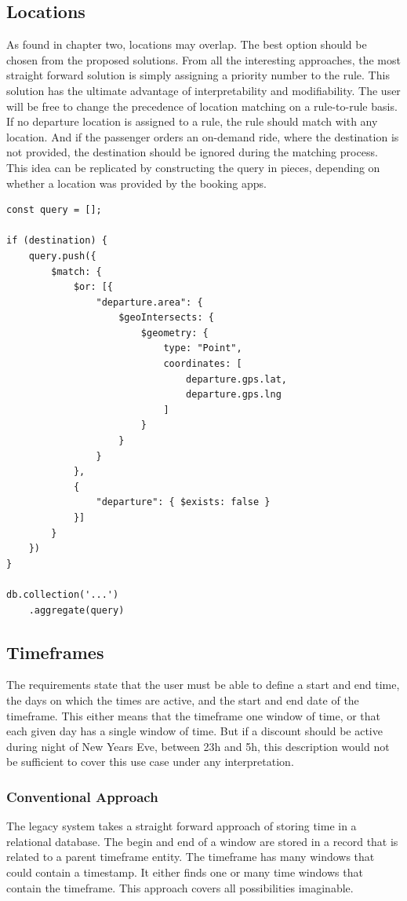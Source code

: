 \subsection{Locations}
As found in chapter two, locations may overlap. The best option should be chosen from the proposed solutions. From all the interesting approaches, the most straight forward solution is simply assigning a priority number to the rule. This solution has the ultimate advantage of interpretability and modifiability. The user will be free to change the precedence of location matching on a rule-to-rule basis. If no departure location is assigned to a rule, the rule should match with any location. And if the passenger orders an on-demand ride, where the destination is not provided, the destination should be ignored during the matching process. This idea can be replicated by constructing the query in pieces, depending on whether a location was provided by the booking apps.

\begin{center}
\noindent\begin{minipage}{.45\textwidth}
\begin{lstlisting}[caption={Matchin destination.}, label={lst:matching-destination}]
const query = [];

if (destination) {
	query.push({
		$match: {
			$or: [{
				"departure.area": {
					$geoIntersects: {
						$geometry: {
							type: "Point",
							coordinates: [
								departure.gps.lat,
								departure.gps.lng
							]
						}
					}
				}
			},
			{
				"departure": { $exists: false }
			}]
		}
	})
}

db.collection('...')
	.aggregate(query)
\end{lstlisting}
\end{minipage}
\end{center}

\subsection{Timeframes}
The requirements state that the user must be able to define a start and end time, the days on which the times are active, and the start and end date of the timeframe. This either means that the timeframe one window of time, or that each given day has a single window of time. But if a discount should be active during night of New Years Eve, between 23h and 5h, this description would not be sufficient to cover this use case under any interpretation.

\subsubsection{Conventional Approach}
The legacy system takes a straight forward approach of storing time in a relational database. The begin and end of a window are stored in a record that is related to a parent timeframe entity. The timeframe has many windows that could contain a timestamp. It either finds one or many time windows that contain the timeframe. This approach covers all possibilities imaginable.

